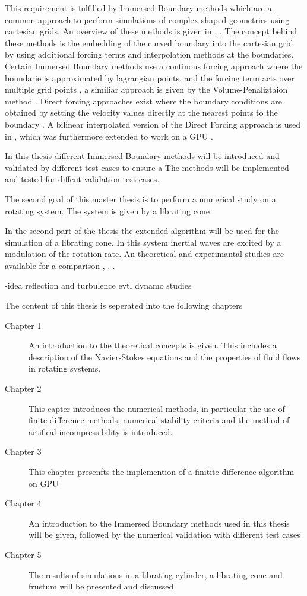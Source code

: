 This requirement is fulfilled by Immersed Boundary methods which are a common
approach to perform simulations of complex-shaped geometries using cartesian grids.
An overview of these methods is given in \citep{Mittal2005}, \citep{Gornak2013}.
The concept behind these methods is the embedding of the curved boundary into the cartesian grid
by using additional forcing terms and interpolation methods at the boundaries.
Certain Immersed Boundary methods use a continous forcing approach where the boundarie is approximated by lagrangian points,
and the forcing term acts over multiple grid points \citep{Mittal2005}, a
similiar approach is given by the Volume-Penaliztaion method \citep{Lulff2011}.
Direct forcing approaches exist where the boundary conditions are obtained by setting the
velocity values directly at the nearest points to the boundary \citep{Fadlun2000}.
A bilinear interpolated version of the Direct Forcing approach is used in \citep{Gornak2013},
which was furthermore extended to work on a GPU \citep{DeLeon2012}.

In this thesis different Immersed Boundary methods will be introduced and validated
by different test cases to ensure a
The methods will be implemented and tested for diffent validation test cases.

\bigbreak

The second goal of this master thesis is to perform a numerical study on a rotating system.
The system is given by a librating cone

In the second part of the thesis the extended algorithm will be used for the simulation of a librating cone.
In this system inertial waves are excited by a modulation of the rotation rate.
An theoretical and experimantal studies are available for a comparison \citep{Sauret2012}, \citep{Beardsley1970}, \citep{Greenspan1969}.

-idea reflection and turbulence evtl dynamo studies

\bigbreak

The content of this thesis is seperated into the following chapters
\begin{description}
\item[Chapter 1] An introduction to the theoretical concepts is given.  This includes a description of the Navier-Stokes equations
                    and the properties of fluid flows in rotating systems.
\item[Chapter 2] This capter introduces the numerical methods, in particular the use of finite difference methods,
                    numerical stability criteria and the method of artifical incompressibility is introduced.
\item[Chapter 3] This chapter presenfts the implemention of a finitite difference  algorithm on GPU

\item[Chapter 4] An introduction to  the Immersed Boundary methods used in this thesis will be given, followed by
                 the numerical validation with different test cases

\item[Chapter 5] The results of simulations in a librating cylinder, a librating cone and frustum will be presented and discussed
\end{description}

